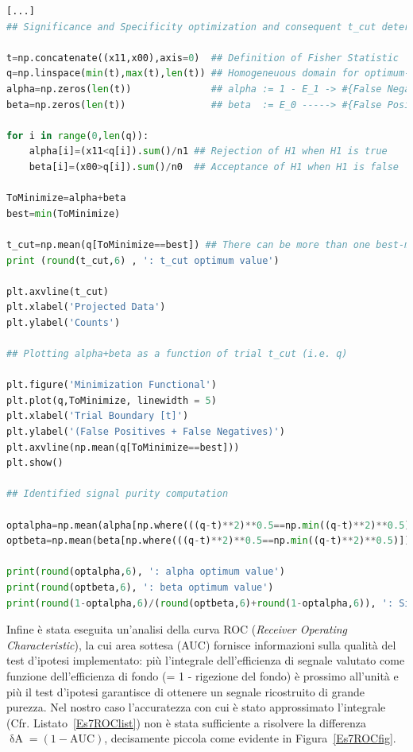 \begin{lstlisting}[language=python, style=Pystyle, caption=\texttt{Python} code for Fisher's boundary value optimization, label=listing:tcut]
[...]
## Significance and Specificity optimization and consequent t_cut determination

t=np.concatenate((x11,x00),axis=0)  ## Definition of Fisher Statistic
q=np.linspace(min(t),max(t),len(t)) ## Homogeneuous domain for optimum-value search
alpha=np.zeros(len(t))              ## alpha := 1 - E_1 -> #{False Negatives}
beta=np.zeros(len(t))               ## beta  := E_0 -----> #{False Positives}

for i in range(0,len(q)):
	alpha[i]=(x11<q[i]).sum()/n1 ## Rejection of H1 when H1 is true
	beta[i]=(x00>q[i]).sum()/n0  ## Acceptance of H1 when H1 is false

ToMinimize=alpha+beta
best=min(ToMinimize)

t_cut=np.mean(q[ToMinimize==best]) ## There can be more than one best-match...
print (round(t_cut,6) , ': t_cut optimum value')

plt.axvline(t_cut) 
plt.xlabel('Projected Data')
plt.ylabel('Counts')

## Plotting alpha+beta as a function of trial t_cut (i.e. q)

plt.figure('Minimization Functional')
plt.plot(q,ToMinimize, linewidth = 5)
plt.xlabel('Trial Boundary [t]')
plt.ylabel('(False Positives + False Negatives)')
plt.axvline(np.mean(q[ToMinimize==best]))
plt.show()

## Identified signal purity computation

optalpha=np.mean(alpha[np.where(((q-t)**2)**0.5==np.min((q-t)**2)**0.5)])
optbeta=np.mean(beta[np.where(((q-t)**2)**0.5==np.min((q-t)**2)**0.5)])

print(round(optalpha,6), ': alpha optimum value')
print(round(optbeta,6), ': beta optimum value')
print(round(1-optalpha,6)/(round(optbeta,6)+round(1-optalpha,6)), ': Signal Purity')
\end{lstlisting}

\newpage

\noindent Infine è stata eseguita un'analisi della curva ROC  (\emph{Receiver Operating Characteristic}), la cui area sottesa (AUC) fornisce informazioni sulla qualità del test d'ipotesi implementato: più l'integrale dell'efficienza di segnale valutato come funzione dell'efficienza di fondo (= 1 - rigezione del fondo) è prossimo all'unità e più il test d'ipotesi garantisce di ottenere un segnale ricostruito di grande purezza. Nel nostro caso l'accuratezza con cui è stato approssimato l'integrale (Cfr. Listato~\ref{Es7ROClist}) non è stata sufficiente a risolvere la differenza $\mathop{\delta A} = (1-\mathrm{AUC})$, decisamente piccola come evidente in Figura~\ref{Es7ROCfig}.

